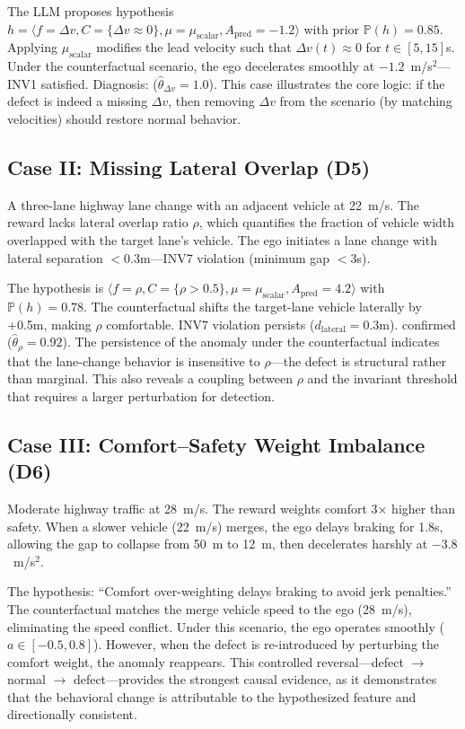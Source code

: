 \documentclass[journal]{IEEEtran}
\theoremstyle{plain}
\newcommand{\Prob}{\mathbb{P}}
\begin{document}
The LLM proposes hypothesis $h = \langle f=\Delta v, C=\{\Delta v \approx 0\}, \mu=\mu_{\text{scalar}}, A_{\text{pred}}=-1.2\rangle$ with prior $\Prob(h)=0.85$. Applying $\mu_{\text{scalar}}$ modifies the lead velocity such that $\Delta v(t) \approx 0$ for $t \in [5,15]$s. Under the counterfactual scenario, the ego decelerates smoothly at $-1.2$~m/s$^2$---INV1 satisfied. Diagnosis:  ($\hat{\theta}_{\Delta v}=1.0$). This case illustrates the core logic: if the defect is indeed a missing $\Delta v$, then removing $\Delta v$ from the scenario (by matching velocities) should restore normal behavior.

\subsection{Case II: Missing Lateral Overlap (D5)}

A three-lane highway lane change with an adjacent vehicle at 22~m/s. The reward lacks lateral overlap ratio $\rho$, which quantifies the fraction of vehicle width overlapped with the target lane's vehicle. The ego initiates a lane change with lateral separation $<0.3$m---INV7 violation (minimum gap $<3$s).

The hypothesis is $\langle f=\rho, C=\{\rho > 0.5\}, \mu=\mu_{\text{scalar}}, A_{\text{pred}}=4.2\rangle$ with $\Prob(h)=0.78$. The counterfactual shifts the target-lane vehicle laterally by +0.5m, making $\rho$ comfortable. INV7 violation persists ($d_{\text{lateral}}=0.3$m).  confirmed ($\hat{\theta}_\rho=0.92$). The persistence of the anomaly under the counterfactual indicates that the lane-change behavior is insensitive to $\rho$---the defect is structural rather than marginal. This also reveals a coupling between $\rho$ and the invariant threshold that requires a larger perturbation for detection.

\subsection{Case III: Comfort--Safety Weight Imbalance (D6)}

Moderate highway traffic at 28~m/s. The reward weights comfort 3$\times$ higher than safety. When a slower vehicle (22~m/s) merges, the ego delays braking for 1.8s, allowing the gap to collapse from 50~m to 12~m, then decelerates harshly at $-3.8$~m/s$^2$.

The hypothesis: ``Comfort over-weighting delays braking to avoid jerk penalties.'' The counterfactual matches the merge vehicle speed to the ego (28~m/s), eliminating the speed conflict. Under this scenario, the ego operates smoothly ($a \in [-0.5, 0.8]$). However, when the defect is re-introduced by perturbing the comfort weight, the anomaly reappears. This controlled reversal---defect $\to$ normal $\to$ defect---provides the strongest causal evidence, as it demonstrates that the behavioral change is attributable to the hypothesized feature and directionally consistent.
\end{document}
